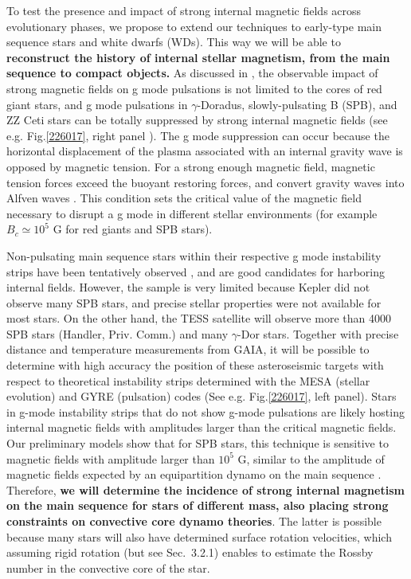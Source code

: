 To test the presence and impact of strong internal magnetic fields across evolutionary phases,
we propose to extend our techniques to early-type main sequence stars and white dwarfs (WDs). This way we will be able to \textbf{reconstruct the history of internal stellar magnetism, from the main sequence to compact objects.} As discussed in \citet{Cantiello_2016}, the observable impact of strong magnetic fields on g mode pulsations is not limited to the cores of red giant stars, and g mode pulsations in $\gamma$-Doradus, slowly-pulsating B (SPB), and ZZ Ceti stars can be totally suppressed by strong internal magnetic fields (see e.g. Fig.\ref{226017}, right panel ). The g mode suppression can occur because the horizontal displacement of the plasma associated with an internal gravity wave is opposed by magnetic tension. For a strong enough magnetic field, magnetic tension forces exceed the buoyant restoring forces, and convert gravity waves into Alfven waves \cite{lecoanet:17}. This condition sets the critical value of the magnetic field necessary to disrupt a g mode in different stellar environments (for example $B_c \simeq 10^5$ G for red giants and SPB stars). 

Non-pulsating main sequence stars within their respective g mode instability strips have been tentatively observed \citep{Balona_2011}, and are good candidates for harboring internal fields.
However, the sample is very limited because Kepler did not observe many SPB stars, and precise stellar properties were not available for most stars. On the other hand, the TESS satellite will observe more than 4000 SPB stars (Handler, Priv. Comm.) and many $\gamma$-Dor stars. Together with precise distance and temperature measurements from GAIA, it will be possible to determine with high accuracy the position of these asteroseismic targets with respect to theoretical instability strips determined with the MESA (stellar evolution) and GYRE (pulsation) codes (See e.g. Fig.\ref{226017}, left panel).
Stars in g-mode instability strips that do not show g-mode pulsations are likely hosting internal magnetic fields with amplitudes larger than the critical
magnetic fields. Our preliminary models show that for SPB stars, this technique is sensitive to magnetic fields with amplitude larger than $10^5$ G,
similar to the amplitude of magnetic fields expected by an equipartition dynamo on the main sequence \citep[See e.g.][]{Featherstone_2009,Augustson_2016}. Therefore, \textbf{we will determine the incidence of strong internal magnetism on the main sequence for stars of different mass, also placing strong constraints on convective core dynamo theories}. The latter is possible because many stars will also have determined surface rotation velocities, which assuming rigid rotation (but see Sec.~3.2.1) enables to estimate the Rossby number in the convective core of the star.

